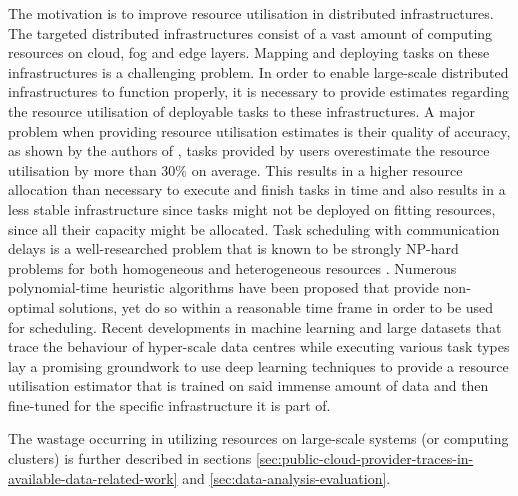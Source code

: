            The motivation is to improve resource utilisation in distributed infrastructures. The targeted distributed infrastructures consist of a vast amount of computing resources on cloud, fog and edge layers.
            Mapping and deploying tasks on these infrastructures is a challenging problem. In order to enable large-scale distributed infrastructures to function properly, it is necessary to provide estimates regarding the resource utilisation of deployable tasks to these infrastructures.
            A major problem when providing resource utilisation estimates is their quality of accuracy, as shown by the authors of \cite{thonglekImprovingResourceUtilization2019}, tasks provided by users overestimate the resource utilisation by more than $30\%$ on average. 
            This results in a higher resource allocation than necessary to execute and finish tasks in time and also results in a less stable infrastructure since tasks might not be deployed on fitting resources, since all their capacity might be allocated.
            Task scheduling with communication delays is a well-researched problem that is known to be strongly NP-hard problems for both homogeneous and heterogeneous resources \cite{orrOptimalTaskScheduling2021}.
            Numerous polynomial-time heuristic algorithms have been proposed that provide non-optimal solutions, yet do so within a reasonable time frame in order to be used for scheduling. Recent developments in machine learning and large datasets that trace the behaviour of hyper-scale data centres \cite{vanooteghemWhatHyperscaleData2023} while executing various task types lay a promising groundwork to use deep learning techniques to provide a resource utilisation estimator that is trained on said immense amount of data and then fine-tuned for the specific infrastructure it is part of.

            The wastage occurring in utilizing resources on large-scale systems (or computing clusters) is further described in sections \ref{sec:public-cloud-provider-traces-in-available-data-related-work} and \ref{sec:data-analysis-evaluation}.


